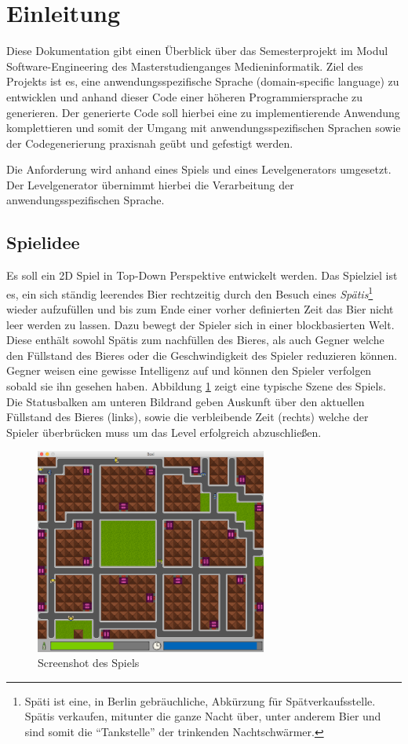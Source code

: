 \section{Einleitung}

Diese Dokumentation gibt einen Überblick über das Semesterprojekt im Modul Software-Engineering des Masterstudienganges Medieninformatik.
Ziel des Projekts ist es, eine anwendungsspezifische Sprache (domain-specific language) zu entwicklen und anhand dieser Code einer höheren Programmiersprache zu generieren.
Der generierte Code soll hierbei eine zu implementierende Anwendung komplettieren und somit der Umgang mit anwendungsspezifischen Sprachen sowie der Codegenerierung praxisnah geübt und gefestigt werden.

Die Anforderung wird anhand eines Spiels und eines Levelgenerators umgesetzt.
Der Levelgenerator übernimmt hierbei die Verarbeitung der anwendungsspezifischen Sprache.

\subsection{Spielidee}

Es soll ein 2D Spiel in Top-Down Perspektive entwickelt werden.
Das Spielziel ist es, ein sich ständig leerendes Bier rechtzeitig durch den Besuch eines \textit{Spätis}\footnote{Späti ist eine, in Berlin gebräuchliche, Abkürzung für Spätverkaufsstelle. Spätis verkaufen, mitunter die ganze Nacht über, unter anderem Bier und sind somit die ``Tankstelle'' der trinkenden Nachtschwärmer.}
wieder aufzufüllen und bis zum Ende einer vorher definierten Zeit das Bier nicht leer werden zu lassen.
Dazu bewegt der Spieler sich in einer blockbasierten Welt.
Diese enthält sowohl Spätis zum nachfüllen des Bieres, als auch Gegner welche den Füllstand des Bieres oder die Geschwindigkeit des Spieler reduzieren können.
Gegner weisen eine gewisse Intelligenz auf und können den Spieler verfolgen sobald sie ihn gesehen haben.
Abbildung \ref{fig:einleitung:screenshot} zeigt eine typische Szene des Spiels.
Die Statusbalken am unteren Bildrand geben Auskunft über den aktuellen Füllstand des Bieres (links), sowie die verbleibende Zeit (rechts) welche der Spieler überbrücken muss um das Level erfolgreich abzuschließen.

\begin{figure}[]
\centering
\includegraphics[width=3in]{img/02_screenshot.png}
\caption{Screenshot des Spiels}
\label{fig:einleitung:screenshot}
\end{figure}


